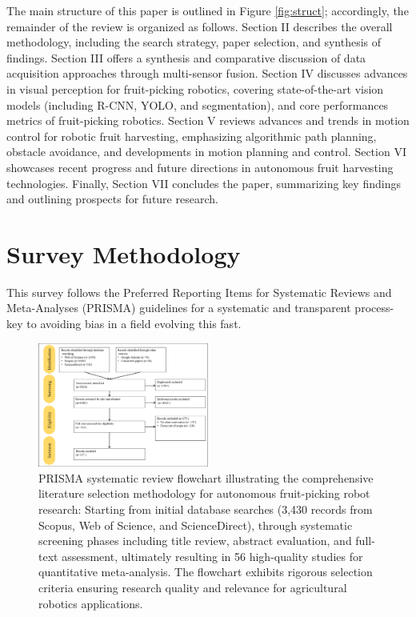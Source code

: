 \documentclass{ieeeaccess}
\begin{document}
The main structure of this paper is outlined in Figure \ref{fig:struct}; accordingly, the remainder of the review is organized as follows. Section II describes the overall methodology, including the search strategy, paper selection, and synthesis of findings. Section III offers a synthesis and comparative discussion of data acquisition approaches through multi-sensor fusion.
Section IV discusses advances in visual perception for fruit-picking robotics, covering state-of-the-art vision models (including R-CNN, YOLO, and segmentation), and core performances metrics of fruit-picking robotics. Section V reviews advances and trends in motion control for robotic fruit harvesting, emphasizing algorithmic path planning, obstacle avoidance, and developments in motion planning and control. Section VI showcases recent progress and future directions in autonomous fruit harvesting technologies. Finally, Section VII concludes the paper, summarizing key findings and outlining prospects for future research.



\section{Survey Methodology}
This survey follows the Preferred Reporting Items for Systematic Reviews and Meta-Analyses (PRISMA) guidelines \cite{page2021prisma} for a systematic and transparent process-key to avoiding bias in a field evolving this fast. 

\begin{figure}[h!]
    \centering
    \includegraphics[width=0.5\textwidth]{fig_prisma1.png}
    \caption{PRISMA systematic review flowchart illustrating the comprehensive literature selection methodology for autonomous fruit-picking robot research: Starting from initial database searches (3,430 records from Scopus, Web of Science, and ScienceDirect), through systematic screening phases including title review, abstract evaluation, and full-text assessment, ultimately resulting in 56 high-quality studies for quantitative meta-analysis. The flowchart exhibits rigorous selection criteria ensuring research quality and relevance for agricultural robotics applications.}
    \label{fig:prisma1}
\end{figure}
\end{document}
